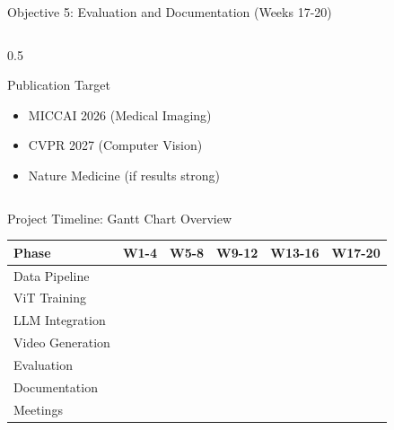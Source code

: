 \documentclass[aspectratio=169]{beamer}
\begin{document}
\begin{frame}{Objective 5: Evaluation and Documentation (Weeks 17-20)}
\begin{columns}
\begin{column}{0.5\textwidth}
            \begin{alertblock}{Publication Target}
                \begin{itemize}
                    \item MICCAI 2026 (Medical Imaging)
                    \item CVPR 2027 (Computer Vision)
                    \item Nature Medicine (if results strong)
                \end{itemize}
            \end{alertblock}
        \end{column}
    \end{columns}
\end{frame}

\begin{frame}{Project Timeline: Gantt Chart Overview}
    \begin{center}
        \begin{tabular}{|l|c|c|c|c|c|}
            \hline
            \textbf{Phase} & \textbf{W1-4} & \textbf{W5-8} & \textbf{W9-12} & \textbf{W13-16} & \textbf{W17-20} \\
            \hline
            Data Pipeline & \cellcolor{ForestGreen!60} & & & & \\
            \hline
            ViT Training & & \cellcolor{ForestGreen!60} & & & \\
            \hline
            LLM Integration & & & \cellcolor{ForestGreen!60} & & \\
            \hline
            Video Generation & & & & \cellcolor{ForestGreen!60} & \\
            \hline
            Evaluation & & & & & \cellcolor{ForestGreen!60} \\
            \hline
            Documentation & \cellcolor{blue!20} & \cellcolor{blue!20} & \cellcolor{blue!20} & \cellcolor{blue!20} & \cellcolor{blue!60} \\
            \hline
            Meetings & \cellcolor{orange!30} & \cellcolor{orange!30} & \cellcolor{orange!30} & \cellcolor{orange!30} & \cellcolor{orange!30} \\
            \hline
        \end{tabular}
    \end{center}
    
    \vspace{1em}
    

\end{frame}
\end{document}
